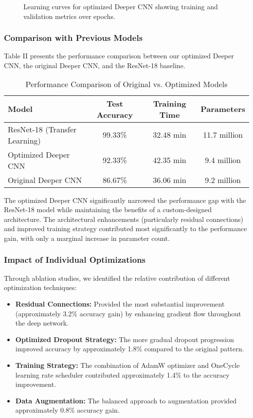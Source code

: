 \begin{figure}[ht]
    \centering
    \caption{Learning curves for optimized Deeper CNN showing training and validation metrics over epochs.}
    \label{fig:optimized_learning_curve}
\end{figure}

\subsubsection{Comparison with Previous Models}
Table II presents the performance comparison between our optimized Deeper CNN, the original Deeper CNN, and the ResNet-18 baseline.

\begin{table}[ht]
\caption{Performance Comparison of Original vs. Optimized Models}
\centering
\begin{tabular}{lccc}
\toprule
\textbf{Model} & \textbf{Test Accuracy} & \textbf{Training Time} & \textbf{Parameters} \\
\midrule
ResNet-18 (Transfer Learning) & 99.33\% & 32.48 min & 11.7 million \\
Optimized Deeper CNN & 92.33\% & 42.35 min & 9.4 million \\
Original Deeper CNN & 86.67\% & 36.06 min & 9.2 million \\
\bottomrule
\end{tabular}
\end{table}

The optimized Deeper CNN significantly narrowed the performance gap with the ResNet-18 model while maintaining the benefits of a custom-designed architecture. The architectural enhancements (particularly residual connections) and improved training strategy contributed most significantly to the performance gain, with only a marginal increase in parameter count.

\subsubsection{Impact of Individual Optimizations}
Through ablation studies, we identified the relative contribution of different optimization techniques:

\begin{itemize}
    \item \textbf{Residual Connections:} Provided the most substantial improvement (approximately 3.2\% accuracy gain) by enhancing gradient flow throughout the deep network.
    
    \item \textbf{Optimized Dropout Strategy:} The more gradual dropout progression improved accuracy by approximately 1.8\% compared to the original pattern.
    
    \item \textbf{Training Strategy:} The combination of AdamW optimizer and OneCycle learning rate scheduler contributed approximately 1.4\% to the accuracy improvement.
    
    \item \textbf{Data Augmentation:} The balanced approach to augmentation provided approximately 0.8\% accuracy gain.
\end{itemize}

